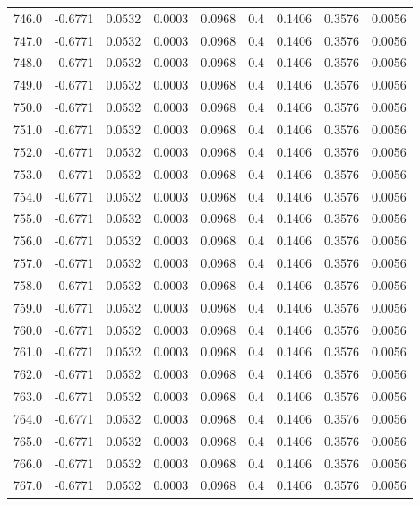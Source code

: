 \begin{longtable}{lrrrrrrrr}
746.0 & -0.6771 & 0.0532 & 0.0003 & 0.0968 & 0.4 & 0.1406 & 0.3576 & 0.0056 \\
747.0 & -0.6771 & 0.0532 & 0.0003 & 0.0968 & 0.4 & 0.1406 & 0.3576 & 0.0056 \\
748.0 & -0.6771 & 0.0532 & 0.0003 & 0.0968 & 0.4 & 0.1406 & 0.3576 & 0.0056 \\
749.0 & -0.6771 & 0.0532 & 0.0003 & 0.0968 & 0.4 & 0.1406 & 0.3576 & 0.0056 \\
750.0 & -0.6771 & 0.0532 & 0.0003 & 0.0968 & 0.4 & 0.1406 & 0.3576 & 0.0056 \\
751.0 & -0.6771 & 0.0532 & 0.0003 & 0.0968 & 0.4 & 0.1406 & 0.3576 & 0.0056 \\
752.0 & -0.6771 & 0.0532 & 0.0003 & 0.0968 & 0.4 & 0.1406 & 0.3576 & 0.0056 \\
753.0 & -0.6771 & 0.0532 & 0.0003 & 0.0968 & 0.4 & 0.1406 & 0.3576 & 0.0056 \\
754.0 & -0.6771 & 0.0532 & 0.0003 & 0.0968 & 0.4 & 0.1406 & 0.3576 & 0.0056 \\
755.0 & -0.6771 & 0.0532 & 0.0003 & 0.0968 & 0.4 & 0.1406 & 0.3576 & 0.0056 \\
756.0 & -0.6771 & 0.0532 & 0.0003 & 0.0968 & 0.4 & 0.1406 & 0.3576 & 0.0056 \\
757.0 & -0.6771 & 0.0532 & 0.0003 & 0.0968 & 0.4 & 0.1406 & 0.3576 & 0.0056 \\
758.0 & -0.6771 & 0.0532 & 0.0003 & 0.0968 & 0.4 & 0.1406 & 0.3576 & 0.0056 \\
759.0 & -0.6771 & 0.0532 & 0.0003 & 0.0968 & 0.4 & 0.1406 & 0.3576 & 0.0056 \\
760.0 & -0.6771 & 0.0532 & 0.0003 & 0.0968 & 0.4 & 0.1406 & 0.3576 & 0.0056 \\
761.0 & -0.6771 & 0.0532 & 0.0003 & 0.0968 & 0.4 & 0.1406 & 0.3576 & 0.0056 \\
762.0 & -0.6771 & 0.0532 & 0.0003 & 0.0968 & 0.4 & 0.1406 & 0.3576 & 0.0056 \\
763.0 & -0.6771 & 0.0532 & 0.0003 & 0.0968 & 0.4 & 0.1406 & 0.3576 & 0.0056 \\
764.0 & -0.6771 & 0.0532 & 0.0003 & 0.0968 & 0.4 & 0.1406 & 0.3576 & 0.0056 \\
765.0 & -0.6771 & 0.0532 & 0.0003 & 0.0968 & 0.4 & 0.1406 & 0.3576 & 0.0056 \\
766.0 & -0.6771 & 0.0532 & 0.0003 & 0.0968 & 0.4 & 0.1406 & 0.3576 & 0.0056 \\
767.0 & -0.6771 & 0.0532 & 0.0003 & 0.0968 & 0.4 & 0.1406 & 0.3576 & 0.0056 \\

\end{longtable}
